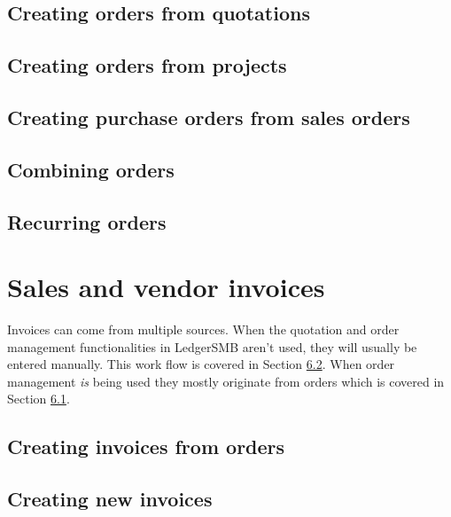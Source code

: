 \section{Creating orders from quotations}

\section{Creating orders from projects}

\section{Creating purchase orders from sales orders}

\section{Combining orders}

\section{Recurring orders}
\label{sec:RecurringOrders}


\chapter{Sales and vendor invoices}

Invoices can come from multiple sources. When the quotation and order
management functionalities in LedgerSMB aren't used, they will usually
be entered manually. This work flow is covered in Section
\ref{sec:ManuallyCreatingInvoices}.
When order management \emph{is} being used they mostly originate from orders
which is covered in Section \ref{sec:InvoicesFromOrders}.



\section{Creating invoices from orders}
\label{sec:InvoicesFromOrders}



\section{Creating new invoices}
\label{sec:ManuallyCreatingInvoices}


